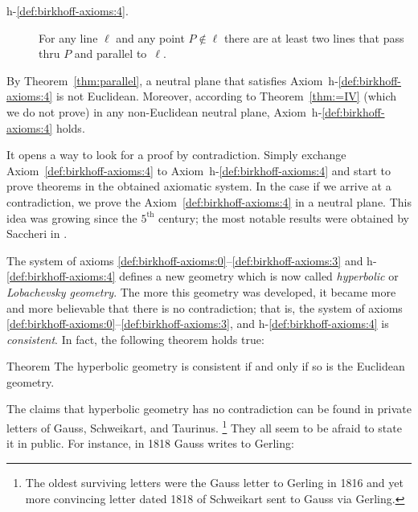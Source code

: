\begin{framed}
\begin{description}
\item[{\rm h-$\!$\ref{def:birkhoff-axioms:4}.}]\label{def:hyperbolic-4a}  
For any line $\ell$ and any point $P\notin\ell$ 
there are at least two lines that pass thru $P$ and parallel to~$\ell$.
\end{description}
\end{framed}

By Theorem~\ref{thm:parallel}, a neutral plane that satisfies Axiom~h-$\!$\ref{def:birkhoff-axioms:4} is not Euclidean. 
Moreover, according to Theorem~\ref{thm:=IV} (which we do not prove) 
in any non-Euclidean neutral plane, Axiom~h-$\!$\ref{def:birkhoff-axioms:4} holds.

It opens a way to look for a proof by contradiction.
Simply exchange  Axiom~\ref{def:birkhoff-axioms:4} to Axiom~h-$\!$\ref{def:birkhoff-axioms:4}
 and start to prove theorems in the obtained axiomatic system.
In the case if we arrive at a contradiction, 
we prove the Axiom~\ref{def:birkhoff-axioms:4} in a neutral plane.
This idea was growing since the $5^\text{th}$ century;
the most notable results were obtained by Saccheri in \cite{saccheri}.

The system of axioms \ref{def:birkhoff-axioms:0}--\ref{def:birkhoff-axioms:3} and h-$\!$\ref{def:birkhoff-axioms:4} defines a new geometry which is now called \emph{hyperbolic} or \emph{Lobachevsky  geometry}.
The more this geometry was developed,
it became more and more believable that there is no contradiction;
that is, the system of axioms \ref{def:birkhoff-axioms:0}--\ref{def:birkhoff-axioms:3}, and h-$\!$\ref{def:birkhoff-axioms:4} is \emph{consistent}.
In fact, the following theorem holds true:


\begin{thm}{Theorem}\label{thm:consistent}
The hyperbolic geometry is consistent if and only if so is the Euclidean geometry.
\end{thm}

The claims
that hyperbolic geometry has no contradiction can be found in private letters of
Gauss, 
Schweikart, 
and Taurinus.%
\footnote{The oldest surviving letters were the Gauss letter to Gerling in 1816 
and yet more convincing letter dated 1818 
of Schweikart sent to Gauss via Gerling.}
They all seem to be afraid to state it in public.
For instance, in 1818 Gauss writes to Gerling:

